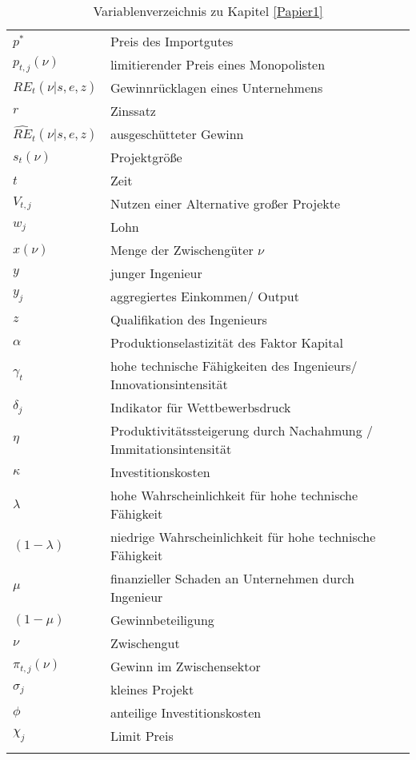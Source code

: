 \begin{longtable}{|l|l|}
		$p^*$ & Preis des Importgutes\\
		$p_{t,j}(\nu)$ & limitierender Preis eines Monopolisten\\
		$RE_{t}(\nu|s,e,z)$ & Gewinnrücklagen eines Unternehmens\\
		$r$ & Zinssatz\\
		$\hat{{RE}}_{t}(\nu|s,e,z)$ & ausgeschütteter Gewinn\\
		$s_{t}(\nu)$ & Projektgr\"o{\ss}e\\
		$t$ & Zeit\\
		$V_{t,j}$ & Nutzen einer Alternative gro\ss{}er Projekte\\
		$w_{j}$ & Lohn\\
		$x(\nu)$ & Menge der Zwischeng\"uter $\nu$\\
		$y$ & junger Ingenieur\\
		$y_{j}$ & aggregiertes Einkommen/ Output \\
		$z$ & Qualifikation des Ingenieurs\\
		$\alpha$ & Produktionselastizit\"at des Faktor Kapital\\
		$\gamma_{t}$ & hohe technische F\"ahigkeiten des Ingenieurs/ Innovationsintensität\\
		$\delta_{j}$ & Indikator f\"ur Wettbewerbsdruck\\
		$\eta$ & Produktivitätssteigerung durch Nachahmung / Immitationsintensität\\
		$\kappa$ & Investitionskosten\\
		$\lambda $ & hohe Wahrscheinlichkeit f\"ur hohe technische F\"ahigkeit\\
		$(1-\lambda)$ & niedrige Wahrscheinlichkeit f\"ur hohe technische F\"ahigkeit\\
		$\mu$ & finanzieller Schaden an Unternehmen durch Ingenieur\\
		$(1-\mu)$ & Gewinnbeteiligung\\
		$\nu$ & Zwischengut\\
		$\pi_{t,j}(\nu)$ & Gewinn im Zwischensektor\\%
		$\sigma_{j}$ & kleines Projekt\\
		$\phi$ & anteilige Investitionskosten\\
		$\chi_{j}$ & Limit Preis\\
		
\hline
\caption{Variablenverzeichnis zu Kapitel \ref{Papier1}}
\end{longtable}